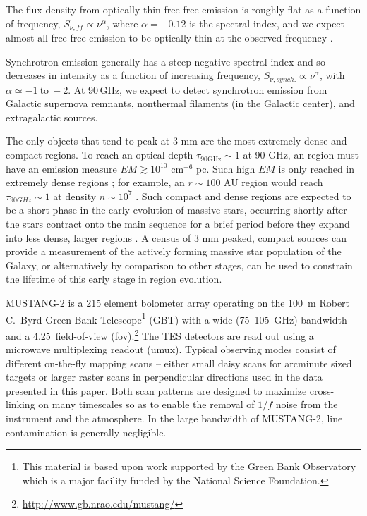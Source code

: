 \documentclass[twocolumn]{aastex62}
\newcommand{\MUSTANG}{MUSTANG-2\xspace}
\begin{document}
The flux density from optically thin free-free emission is roughly flat as a
function of frequency, $S_{\nu, ff} \propto \nu^{\alpha}$, where $\alpha=-0.12$
is the spectral index, and we expect almost
all free-free emission to be optically thin at the observed frequency
\citep{Wilson2009a,Condon2007a,Condon2016a}. 

Synchrotron emission generally has a steep negative spectral index and so
decreases in intensity as a function of increasing frequency, $S_{\nu,
synch.}\propto \nu^{\alpha}$, with $\alpha\simeq -1 \mathrm{~to~}
-2$.  At 90\,GHz, we expect to detect synchrotron emission from Galactic
supernova remnants, nonthermal filaments (in the Galactic center), and
extragalactic sources.

The only objects that tend to peak at 3 mm are the most extremely dense and
compact \hii regions.  To reach an optical depth $\tau_{90 \mathrm{GHz}} \sim1$
at 90 GHz, an \hii region must have an emission measure $EM\gtrsim10^{10}$
cm$^{-6}$ pc.  Such high $EM$ is only reached in extremely dense regions
\citep[e.g.][]{Galvan-Madrid2009a}; for example, an $r\sim100$ AU \hii region
would reach $\tau_{90 GHz}\sim1$ at density $n\sim10^7$ \percc
\citep[][]{Wilson2009a,Condon2016a}.  Such compact and dense \hii regions are
expected to be a short phase in the early evolution of massive stars, occurring
shortly after the stars contract onto the main sequence for a brief period
before they expand into less dense, larger \hii regions \citep{Wood1989b}.  A
census of 3 mm peaked, compact sources can provide a measurement of the
actively forming massive star population of the Galaxy, or alternatively by
comparison to other stages, can be used to constrain the lifetime of this early
stage in \hii region evolution.


\MUSTANG \citep{Dicker2014a} is a 215 element bolometer array operating on the
100~m Robert C.\ Byrd Green Bank Telescope\footnote{This material is
based upon work supported by the Green Bank Observatory which is a major
facility funded by the National Science Foundation.} (GBT) with a wide
(75--105~GHz) bandwidth and a 4.25\arcmin\ field-of-view
(fov).\footnote{\url{http://www.gb.nrao.edu/mustang/}}  The TES detectors are 
read out using a microwave multiplexing readout (umux). Typical
observing modes consist of different on-the-fly mapping scans -- either small
daisy scans for arcminute sized targets or larger raster scans in perpendicular
directions used in the data presented in this paper.  Both scan patterns are
designed to maximize cross-linking on many timescales so as to enable the
removal of $1/f$ noise from the instrument and the atmosphere.  In the large
bandwidth of \MUSTANG, line contamination is generally negligible.
\end{document}
